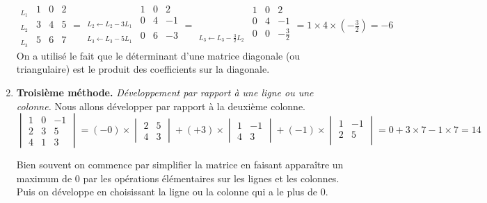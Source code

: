 \documentclass[11pt,a4paper]{article}
\begin{document}
\begin{enumerate}
$$ \begin{array}{l|ccc|}
    _{L_1} & 1 & 0 & 2 \\
    _{L_2} & 3 & 4 & 5\\
    _{L_3} & 5 & 6  & 7
  \end{array}
= \begin{array}{l|ccc|}
    & 1 & 0 & 2  \\
    _{L_2 \leftarrow L_2-3L_1} & 0 & 4 & -1 \\
    _{L_3 \leftarrow L_3-5L_1} & 0 & 6  & -3 \\
  \end{array}
= \begin{array}{l|ccc|}
    & 1 & 0 & 2 \\
    & 0 & 4 & -1 \\
    _{L_3 \leftarrow L_3-\frac32 L_2} & 0 & 0  & -\frac32 \\
  \end{array} = 1\times 4 \times (-\tfrac32) = -6
$$
On a utilisé le fait  que le déterminant d'une matrice diagonale (ou triangulaire) est le produit
des coefficients sur la diagonale.


  \item \textbf{Troisième méthode.} \emph{Développement par rapport à une ligne ou une colonne.}
Nous allons développer par rapport à la deuxième colonne. 
$$\begin{vmatrix}
    1 & 0 & -1 \\
    2 & 3 & 5  \\
    4 & 1 & 3
  \end{vmatrix}
= (-0) \times \begin{vmatrix}
    2 & 5  \\
    4 & 3
  \end{vmatrix}
+ (+3)\times \begin{vmatrix}
    1 & -1 \\
    4 & 3
  \end{vmatrix}
+ (-1) \times \begin{vmatrix}
    1 & -1 \\
    2 & 5  \\
  \end{vmatrix}
= 0 + 3 \times 7 - 1  \times 7 = 14$$


Bien souvent on commence par simplifier la matrice en faisant apparaître un maximum de $0$
par les opérations élémentaires sur les lignes et les colonnes. Puis on développe en choisissant 
la ligne ou la colonne qui a le plus de $0$.



\end{enumerate}
\end{document}
